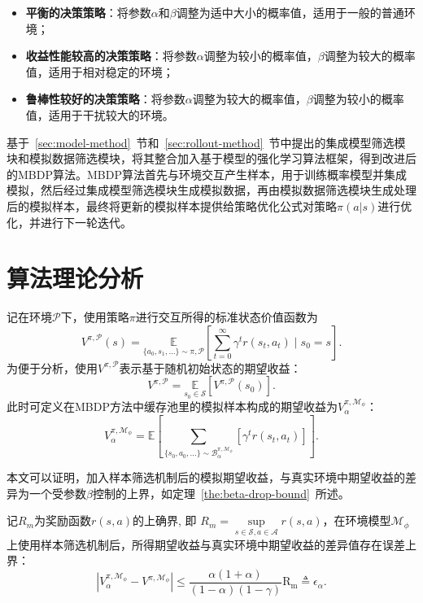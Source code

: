 \begin{itemize}
    \item \textbf{平衡的决策策略}：将参数$\alpha$和$\beta$调整为适中大小的概率值，适用于一般的普通环境；
    \item \textbf{收益性能较高的决策策略}：将参数$\alpha$调整为较小的概率值，$\beta$调整为较大的概率值，适用于相对稳定的环境；
    \item \textbf{鲁棒性较好的决策策略}：将参数$\alpha$调整为较大的概率值，$\beta$调整为较小的概率值，适用于干扰较大的环境。
\end{itemize}

基于~\ref{sec:model-method}~节和~\ref{sec:rollout-method}~节中提出的集成模型筛选模块和模拟数据筛选模块，将其整合加入基于模型的强化学习算法框架，得到改进后的MBDP算法。MBDP算法首先与环境交互产生样本，用于训练概率模型并集成模拟，然后经过集成模型筛选模块生成模拟数据，再由模拟数据筛选模块生成处理后的模拟样本，最终将更新的模拟样本提供给策略优化公式对策略$\pi(a|s)$进行优化，并进行下一轮迭代。

\section{算法理论分析}

记在环境$\mathcal{P}$下，使用策略$\pi$进行交互所得的标准状态价值函数为
\begin{equation}\label{def:eta-s}
    {V}^{\pi,\mathcal{P}}(s) = \underset{\{a_0,s_1,\ldots\} \sim \pi,\mathcal{P}}{\mathbb{E}}\left[\sum_{t=0}^\infty\gamma^t r(s_t,a_t)\mid s_0=s\right].
\end{equation}
为便于分析，使用${V}^{\pi,\mathcal{P}}$表示基于随机初始状态的期望收益：
\begin{equation}\label{def:eta-expectation}
    {V}^{\pi,\mathcal{P}} = \underset{s_0\in\mathcal{S}}{\mathbb{E}} \left[{V}^{\pi,\mathcal{P}}(s_0)\right].
\end{equation}
此时可定义在MBDP方法中缓存池里的模拟样本构成的期望收益为${V}^{\pi,\mathcal{M}_\phi}_\alpha$：
\begin{equation}\label{def:eta-beta}
    {V}^{\pi,\mathcal{M}_\phi}_\alpha=\mathbb{E}\left[{\sum}_{\{s_0,a_0,\ldots\} \sim\mathcal{B}_\alpha^{\pi,\mathcal{M}_\phi}}\left[\gamma^t r(s_t,a_t)\right]\right].
\end{equation}

本文可以证明，加入样本筛选机制后的模拟期望收益，与真实环境中期望收益的差异为一个受参数$\beta$控制的上界，如定理~\ref{the:beta-drop-bound}~所述。

\begin{theorem}\label{the:beta-drop-bound}

记$R_{m}$为奖励函数$r(s,a)$的上确界, 即 $R_{m}=\underset{s\in\mathcal{S},a\in\mathcal{A}}{\sup}r(s,a)$，在环境模型$\mathcal{M}_\phi$上使用样本筛选机制后，所得期望收益与真实环境中期望收益的差异值存在误差上界：
\begin{equation}
    |{V}_\alpha^{\pi, \mathcal{M}_{\phi}} - {V}^{\pi,\mathcal{M}_{\phi}}| \leq \frac{\alpha(1+\alpha)}{(1-\alpha)(1-\gamma)}\mathrm{R_{m}} \triangleq \epsilon_\alpha.
\label{eq:eps-beta}
\end{equation}
\end{theorem}

